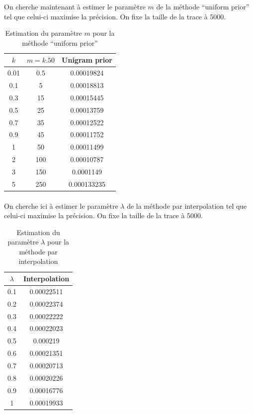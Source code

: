 \documentclass[a4paper,titlepage]{report}
\begin{document}
On cherche maintenant à estimer le paramètre $m$ de la méthode ``uniform prior'' tel que celui-ci maximise la précision. On fixe la taille de la trace à 5000.
\begin{table}[h]
	\center
	\begin{tabular}{c|c|c}
		$k$ & $m = k . 50$ & Unigram prior\\
		\hline
		0.01 & 0.5 & \num{0.00019824}\\
		0.1 & 5 & \num{0.00018813}\\
		0.3 & 15 & \num{0.00015445}\\
		0.5 & 25 & \num{0.00013759}\\
		0.7 & 35 & \num{0.00012522}\\
		0.9 & 45 & \num{0.00011752}\\
		1 & 50 & \num{0.00011499}\\
		2 & 100 & \num{0.00010787}\\
		3 & 150 & \num{0.0001149}\\
		5 & 250 & \num{0.000133235}
	\end{tabular}
	\caption{Estimation du paramètre $m$ pour la méthode ``uniform prior''}
\end{table}

\paragraph{}

On cherche ici à estimer le paramètre $\lambda$ de la méthode par interpolation tel que celui-ci maximise la précision. On fixe la taille de la trace à 5000.
\begin{table}[h]
	\center
	\begin{tabular}{c|c}
		$\lambda$ & Interpolation\\
		\hline
		0.1 & \num{0.00022511}\\
		0.2 & \num{0.00022374}\\
		0.3 & \num{0.00022222}\\
		0.4 & \num{0.00022023}\\
		0.5 & \num{0.000219}\\
		0.6 & \num{0.00021351}\\
		0.7 & \num{0.00020713}\\
		0.8 & \num{0.00020226}\\
		0.9 & \num{0.00016776}\\
		1 & \num{0.00019933}
	\end{tabular}
	\caption{Estimation du paramètre $\lambda$ pour la méthode par interpolation}
\end{table}
\end{document}
